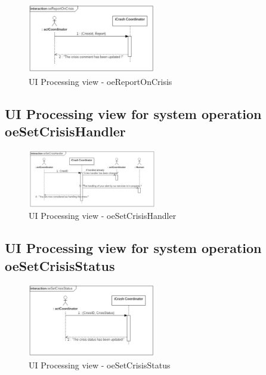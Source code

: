 \begin{figure}[h]
	\centering	
	\captionsetup{justification=centering}
	\includegraphics[width=0.5\textwidth]{./images/ui_oeReportOnCrisis.eps}
	\caption{UI Processing view - oeReportOnCrisis}
\end{figure}


\subsection{UI Processing view for system operation oeSetCrisisHandler}

\begin{figure}[h]
	\centering	
	\captionsetup{justification=centering}
	\includegraphics[width=0.5\textwidth]{./images/ui_oeSetCrisisHandler.eps}
	\caption{UI Processing view - oeSetCrisisHandler}
\end{figure}


\subsection{UI Processing view for system operation oeSetCrisisStatus}

\begin{figure}[h]
	\centering	
	\captionsetup{justification=centering}
	\includegraphics[width=0.5\textwidth]{./images/ui_oeSetCrisisStatus.eps}
	\caption{UI Processing view - oeSetCrisisStatus}
\end{figure}


